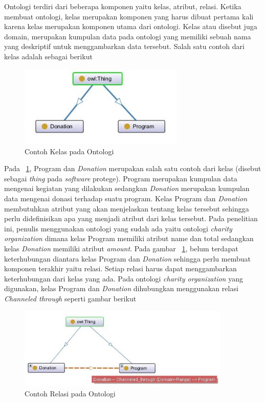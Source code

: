 Ontologi terdiri dari beberapa komponen yaitu kelas, atribut, relasi. Ketika membuat ontologi, kelas merupakan komponen yang harus dibuat pertama kali karena kelas merupakan komponen utama dari ontologi. Kelas atau disebut juga domain, merupakan kumpulan data pada ontologi yang memiliki sebuah nama yang deskriptif untuk menggambarkan data tersebut. Salah satu contoh dari kelas adalah sebagai berikut

\begin{figure}
	\centering
	\includegraphics[width=0.7\textwidth]
	{pics/domain.jpg}
	\caption{Contoh Kelas pada Ontologi}
	\label{fig:class}
\end{figure}
\vspace{-0.3cm}

Pada \pic~\ref{fig:class}, Program dan \textit{Donation} merupakan salah satu contoh dari kelas (disebut sebagai \textit{thing} pada \textit{software} protege). Program merupakan kumpulan data mengenai kegiatan yang dilakukan sedangkan \textit{Donation} merupakan kumpulan data mengenai donasi terhadap suatu program. Kelas Program dan \textit{Donation} membutuhkan atribut yang akan menjelaskan tentang kelas tersebut sehingga perlu didefinisikan apa yang menjadi atribut dari kelas tersebut. Pada penelitian ini, penulis menggunakan ontologi yang sudah ada yaitu ontologi \textit{charity organization} dimana kelas Program memiliki atribut name dan total sedangkan kelas \textit{Donation} memiliki atribut \textit{amount}. Pada gambar \pic~\ref{fig:class}, belum terdapat keterhubungan diantara kelas Program dan \textit{Donation} sehingga perlu membuat komponen terakhir yaitu relasi. Setiap relasi harus dapat menggambarkan keterhubungan dari kelas yang ada. Pada ontologi \textit{charity organization} yang digunakan, kelas Program dan \textit{Donation} dihubungkan menggunakan relasi \textit{Channeled through} seperti gambar berikut

\begin{figure}
	\centering
	\includegraphics[width=0.9\textwidth]
	{pics/relationClass.jpg}
	\caption{Contoh Relasi pada Ontologi}
	\label{fig:relationClass}
\end{figure}
\vspace{-0.3cm}


